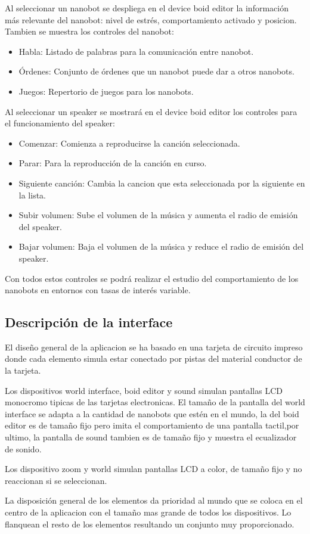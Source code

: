 Al seleccionar un nanobot se despliega en el device boid editor la información más relevante del nanobot: nivel de estrés, comportamiento activado y posicion. Tambien se muestra los controles del nanobot: 
\begin{itemize}
 \item Habla: Listado de palabras para la comunicación entre nanobot.
 \item Órdenes: Conjunto de órdenes que un nanobot puede dar a otros nanobots.
 \item Juegos: Repertorio de juegos para los nanobots.
\end{itemize}

Al seleccionar un speaker se mostrará en el device boid editor los controles para el funcionamiento del speaker:
\begin{itemize}
 \item Comenzar: Comienza a reproducirse la canción seleccionada.
 \item Parar: Para la reproducción de la canción en curso.
 \item Siguiente canción: Cambia la cancion que esta seleccionada por la siguiente en la lista.
 \item Subir volumen: Sube el volumen de la música y aumenta el radio de emisión del speaker.
 \item Bajar volumen: Baja el volumen de la música y reduce el radio de emisión del speaker.
\end{itemize}

Con todos estos controles se podrá realizar el estudio del comportamiento de los nanobots en entornos con tasas de interés variable.

\subsection{Descripción de la interface}
\label{sec:descricion_interface}
El diseño general de la aplicacion se ha basado en una tarjeta de circuito impreso donde cada elemento simula estar conectado por pistas del material conductor de la tarjeta.

Los dispositivos world interface, boid editor y sound  simulan pantallas LCD monocromo tipicas de las tarjetas electronicas. El tamaño de la pantalla del world interface se adapta a la cantidad de nanobots que estén en el mundo, la del boid editor es de tamaño fijo pero imita el comportamiento de una pantalla tactil,por ultimo, la pantalla de sound tambien es de tamaño fijo y muestra el ecualizador de sonido.

Los dispositivo zoom y world simulan pantallas LCD a color, de tamaño fijo y no reaccionan si se seleccionan. 

La disposición general de los elementos da prioridad al mundo que se coloca en el centro de la aplicacion con el tamaño mas grande de todos los dispositivos. Lo flanquean el resto de los elementos resultando un conjunto muy proporcionado.